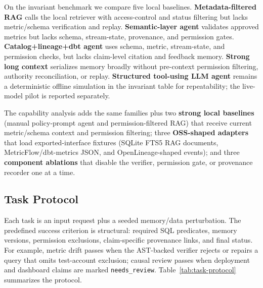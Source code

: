 \documentclass[10pt]{article}
\newcommand{\code}[1]{\texttt{#1}}
\begin{document}
On the invariant benchmark we compare five local baselines. \textbf{Metadata-filtered RAG} calls the local retriever with access-control and status filtering but lacks metric/schema verification and replay. \textbf{Semantic-layer agent} validates approved metrics but lacks schema, stream-state, provenance, and permission gates. \textbf{Catalog+lineage+dbt agent} uses schema, metric, stream-state, and permission checks, but lacks claim-level citation and feedback memory. \textbf{Strong long context} serializes memory broadly without pre-context permission filtering, authority reconciliation, or replay. \textbf{Structured tool-using LLM agent} remains a deterministic offline simulation in the invariant table for repeatability; the live-model pilot is reported separately.

The capability analysis adds the same families plus two \textbf{strong local baselines} (manual policy-prompt agent and permission-filtered RAG) that receive current metric/schema context and permission filtering; three \textbf{OSS-shaped adapters} that load exported-interface fixtures (SQLite FTS5 RAG documents, MetricFlow/dbt-metrics JSON, and OpenLineage-shaped events); and three \textbf{component ablations} that disable the verifier, permission gate, or provenance recorder one at a time.

\subsection{Task Protocol}
Each task is an input request plus a seeded memory/data perturbation. The predefined success criterion is structural: required SQL predicates, memory versions, permission exclusions, claim-specific provenance links, and final status. For example, metric drift passes when the AST-backed verifier rejects or repairs a query that omits test-account exclusion; causal review passes when deployment and dashboard claims are marked \code{needs\_review}. Table~\ref{tab:task-protocol} summarizes the protocol.
\end{document}
